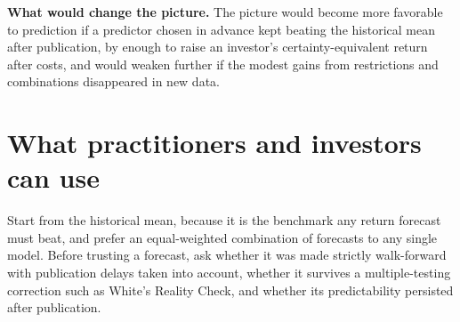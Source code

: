 \textbf{What would change the picture.} The picture would become more favorable to prediction if a predictor chosen in advance kept beating the historical mean after publication, by enough to raise an investor's certainty-equivalent return after costs, and would weaken further if the modest gains from restrictions and combinations disappeared in new data.

\section{What practitioners and investors can use}
\label{sec:09-investors}

Start from the historical mean, because it is the benchmark any return forecast must beat, and prefer an equal-weighted combination of forecasts to any single model. Before trusting a forecast, ask whether it was made strictly walk-forward with publication delays taken into account, whether it survives a multiple-testing correction such as White's Reality Check, and whether its predictability persisted after publication.

\makeatletter
{}
\makeatother

